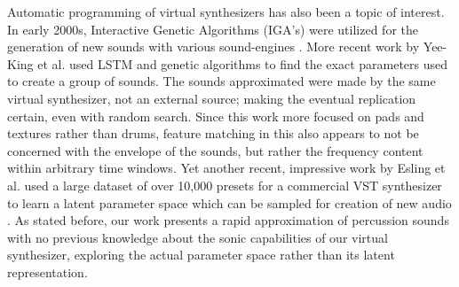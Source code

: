 \documentclass{nime-alternate} %
\begin{document}
Automatic programming of virtual synthesizers has also been a topic of interest. In early 2000s, Interactive Genetic Algorithms (IGA's) were utilized for the generation of new sounds with various sound-engines \cite{johnson1999exploring,dahlstedt2001creating}. More recent work by Yee-King et al. \cite{yee2018automatic} used LSTM and genetic algorithms to find the exact parameters used to create a group of sounds. The sounds approximated were made by the same virtual synthesizer, not an external source; making the eventual replication certain, even with random search. Since this work more focused on pads and textures rather than drums, feature matching in this also appears to not be concerned with the envelope of the sounds, but rather the frequency content within arbitrary time windows. Yet another recent, impressive work by Esling et al. used a large dataset of over 10,000 presets for a commercial VST synthesizer to learn a latent parameter space which can be sampled for creation of new audio \cite{esling2019universal}. As stated before, our work presents a rapid approximation of percussion sounds with no previous knowledge about the sonic capabilities of our virtual synthesizer, exploring the actual parameter space rather than its latent representation. 
\begin{table}[h!]
\centering
{}
\caption{Synthesizer Submodule Parameters}
\label{table:1}
\end{table}
\end{document}
